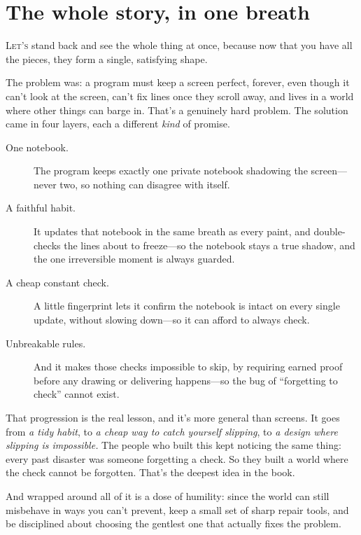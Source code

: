 \documentclass[11pt,twoside]{book}
\begin{document}
\chapter{The whole story, in one breath}
\lettrine{L}{et's} stand back and see the whole thing at once, because now that
you have all the pieces, they form a single, satisfying shape.

The problem was: a program must keep a screen perfect, forever, even though it
can't look at the screen, can't fix lines once they scroll away, and lives in a
world where other things can barge in. That's a genuinely hard problem. The
solution came in four layers, each a different \emph{kind} of promise.

\begin{description}
\item[One notebook.] The program keeps exactly one private notebook shadowing
  the screen---never two, so nothing can disagree with itself.
\item[A faithful habit.] It updates that notebook in the same breath as every
  paint, and double-checks the lines about to freeze---so the notebook stays a
  true shadow, and the one irreversible moment is always guarded.
\item[A cheap constant check.] A little fingerprint lets it confirm the
  notebook is intact on every single update, without slowing down---so it can
  afford to always check.
\item[Unbreakable rules.] And it makes those checks impossible to skip, by
  requiring earned proof before any drawing or delivering happens---so the bug
  of ``forgetting to check'' cannot exist.
\end{description}

That progression is the real lesson, and it's more general than screens. It
goes from \emph{a tidy habit}, to \emph{a cheap way to catch yourself slipping},
to \emph{a design where slipping is impossible.} The people who built this kept
noticing the same thing: every past disaster was someone forgetting a check. So
they built a world where the check cannot be forgotten. That's the deepest idea
in the book.

And wrapped around all of it is a dose of humility: since the world can still
misbehave in ways you can't prevent, keep a small set of sharp repair tools,
and be disciplined about choosing the gentlest one that actually fixes the
problem.
\end{document}
